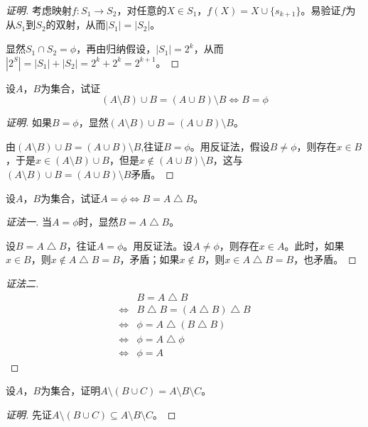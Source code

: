 \documentclass{article}
\begin{document}
\begin{CJK}{UTF8}{gbsn}
\begin{proof}[证明]
  考虑映射$f:S_1\to S_2$，对任意的$X\in S_1$，$f(X)=X\cup \{s_{k+1}\}$。易验证$f$为从$S_1$到$S_2$的双射，从而$|S_1|=|S_2|$。

  显然$S_1\cap S_2=\phi$，再由归纳假设，$|S_1|=2^k$，从而$|2^S|=|S_1|+|S_2|=2^k+2^k=2^{k+1}$。

\end{proof}
\begin{Exercise}
  设$A$，$B$为集合，试证
  \[(A\setminus B)\cup B = (A\cup B)\setminus B \Leftrightarrow B = \phi\]
\end{Exercise}
\begin{proof}[证明]
  如果$B = \phi$，显然$(A\setminus B)\cup B = (A\cup B)\setminus B$。

  由$(A\setminus B)\cup B = (A\cup B)\setminus B$,往证$B=\phi$。用反证法，假设$B\neq \phi$，则存在$x\in B$，于是$x\in(A\setminus B)\cup B$，但是$x\notin (A\cup B)\setminus B$，这与$(A\setminus B)\cup B = (A\cup B)\setminus B $矛盾。
\end{proof}
\begin{Exercise}
  设$A$，$B$为集合，试证$A=\phi \Leftrightarrow B= A\bigtriangleup B$。
\end{Exercise}
\begin{proof}[证法一]
  当$A=\phi$时，显然$B= A\bigtriangleup B$。

  设$B= A\bigtriangleup B$，往证$A=\phi$。用反证法。设$A\neq \phi$，则存在$x\in A$。此时，如果$x\in B$，则$x\notin A\bigtriangleup B = B$，矛盾；如果$x\notin B$，则$x\in A\bigtriangleup B=B$，也矛盾。
\end{proof}

\begin{proof}[证法二]
  \begin{equation*}
    \begin{split}
      &B= A\bigtriangleup B \\
      \Leftrightarrow& B \bigtriangleup B = (A\bigtriangleup B)\bigtriangleup B\\
      \Leftrightarrow& \phi = A\bigtriangleup (B\bigtriangleup B)\\
            \Leftrightarrow& \phi = A\bigtriangleup \phi   \\
      \Leftrightarrow& \phi = A   
    \end{split}
  \end{equation*}
\end{proof}

\begin{Exercise}
  设$A$，$B$为集合，证明$A\setminus (B\cup C) = A\setminus B \setminus C$。
\end{Exercise}
\begin{proof}[证明]
  先证$A\setminus (B\cup C) \subseteq A\setminus B \setminus C$。


\end{proof}
\end{CJK}
\end{document}
